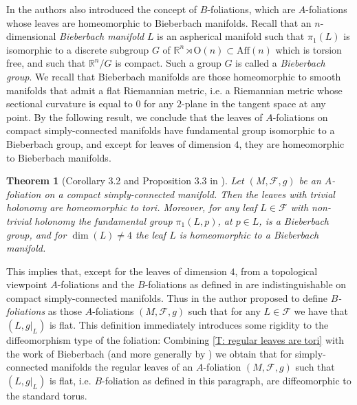 \documentclass[12pt,a4paper,reqno]{amsart}
\newtheorem{theorem}{Theorem}[section]
\theoremstyle{definition}
\numberwithin{equation}{section}
\newcommand{\fol}{\mathcal{F}}
\newcommand{\R}{\mathbb{R}} %
\begin{document}
In \cite{GalazGarciaRadeschi2015} the authors  also introduced the concept of $B$-foliations, which are $A$-foliations whose leaves are homeomorphic to Bieberbach manifolds. Recall that an $n$-dimensional \emph{Bieberbach manifold} $L$ is an aspherical manifold such that $\pi_1(L)$ is isomorphic to  a discrete subgroup $G$ of  $\R^n\rtimes  \mathrm{O}(n)\subset \mathrm{Aff}(n)$ which is torsion free, and such that $\R^n/G$ is compact. Such a group $G$ is called a \emph{Bieberbach group}. We recall that Bieberbach manifolds are those homeomorphic to  smooth manifolds that admit a flat Riemannian metric, i.e. a Riemannian metric whose sectional curvature is equal to $0$ for any $2$-plane in the tangent space at any point. By the following result, we conclude that the leaves of $A$-foliations on compact simply-connected manifolds have fundamental group isomorphic to a Bieberbach group, and except for leaves of dimension $4$, they are homeomorphic to Bieberbach manifolds. 

\begin{theorem}[Corollary 3.2 and Proposition 3.3 in \cite{Corro2023}]
Let $(M,\fol,g)$ be an $A$-foliation on a compact simply-connected manifold. Then the leaves with trivial holonomy are homeomorphic to tori. Moreover, for any leaf $L\in \fol$ with non-trivial holonomy the fundamental group $\pi_1(L,p)$, at $p\in L$, is a Bieberbach group,  and for $\dim(L)\neq 4$ the leaf $L$ is homeomorphic to a Bieberbach manifold. 
\end{theorem}

This implies that, except for the leaves of dimension $4$, from a topological viewpoint $A$-foliations and the $B$-foliations as defined in \cite{GalazGarciaRadeschi2015} are indistinguishable on compact simply-connected manifolds.  Thus in \cite[Remark 3.4]{Corro2023} the author proposed to define \emph{$B$-foliations} as those $A$-foliations $(M,\fol,g)$ such that for any $L\in \fol$ we have that $(L,g|_{L})$ is flat. This definition immediately introduces some rigidity to the diffeomorphism type of the foliation: Combining \th\ref{T: regular leaves are tori} with  the work of Bieberbach \cite{Bieberbach} (and more generally by  \cite[Theorem 3]{FarrellJonesOntaneda2007}) we obtain that for simply-connected manifolds the regular leaves of an $A$-foliation $(M,\fol,g)$ such that $(L,g|_{L})$ is flat, i.e. $B$-foliation as defined in this paragraph, are diffeomorphic to the standard torus.
\end{document}
